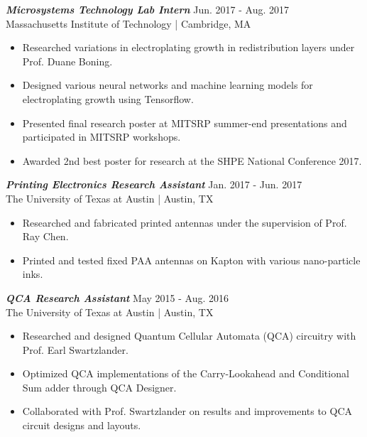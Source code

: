\documentclass[letter]{res}
\begin{document}
\begin{resume}
\vspace{-2mm}

{\sl \textbf{Microsystems Technology Lab Intern}} \hfill Jun. 2017 - Aug. 2017\\
Massachusetts Institute of Technology | Cambridge, MA \newline

 \vspace{-4mm}

 \begin{itemize}
 \item Researched variations in electroplating growth in redistribution layers under Prof. Duane Boning.
 \item Designed various neural networks and machine learning models for electroplating growth using Tensorflow.
 \item Presented final research poster at MITSRP summer-end presentations and participated in MITSRP workshops.
 \item Awarded 2nd best poster for research at the SHPE National Conference 2017.
 \end{itemize}

\vspace{-2mm}

{\sl \textbf{Printing Electronics Research Assistant}} \hfill Jan. 2017 - Jun. 2017\\
The University of Texas at Austin | Austin, TX \newline

 \vspace{-4mm}

 \begin{itemize}
 \item Researched and fabricated printed antennas under the supervision of Prof. Ray Chen.
 \item Printed and tested fixed PAA antennas on Kapton with various nano-particle inks.
 \end{itemize}

\vspace{-2mm}

{\sl \textbf{QCA Research Assistant}} \hfill May 2015 - Aug. 2016\\
The University of Texas at Austin | Austin, TX \newline

 \vspace{-4mm}

 \begin{itemize}
 \item Researched and designed Quantum Cellular Automata (QCA) circuitry with Prof. Earl Swartzlander.
 \item Optimized QCA implementations of the Carry-Lookahead and Conditional Sum adder through QCA Designer.
 \item Collaborated with Prof. Swartzlander on results and improvements to QCA circuit designs and layouts.
 \end{itemize}


\end{resume}
\end{document}
